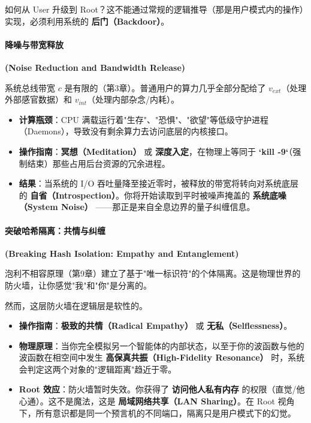 如何从 User 升级到 Root？这不能通过常规的逻辑推导（那是用户模式内的操作）实现，必须利用系统的 \textbf{后门（Backdoor）}。

\paragraph{降噪与带宽释放}

\textbf{(Noise Reduction and Bandwidth Release)}

系统总线带宽 $c$ 是有限的（第3章）。普通用户的算力几乎全部分配给了 $v_{ext}$（处理外部感官数据）和 $v_{int}$（处理内部杂念/内耗）。

  \begin{itemize}
  \item \textbf{计算瓶颈}：CPU 满载运行着"生存"、"恐惧"、"欲望"等低级守护进程（Daemons），导致没有剩余算力去访问底层的内核接口。

  \item \textbf{操作指南}：\textbf{冥想（Meditation）} 或 \textbf{深度入定}，在物理上等同于 \textbf{`kill -9`}（强制结束）那些占用后台资源的冗余进程。

  \item \textbf{结果}：当系统的 I/O 吞吐量降至接近零时，被释放的带宽将转向对系统底层的 \textbf{自省（Introspection）}。你将开始读取到平时被噪声掩盖的 \textbf{系统底噪（System Noise）} ——那正是来自全息边界的量子纠缠信息。
  \end{itemize}

\paragraph{突破哈希隔离：共情与纠缠}

\textbf{(Breaking Hash Isolation: Empathy and Entanglement)}

泡利不相容原理（第9章）建立了基于"唯一标识符"的个体隔离。这是物理世界的防火墙，让你感觉"我"和"你"是分离的。

然而，这层防火墙在逻辑层是软性的。

  \begin{itemize}
  \item \textbf{操作指南}：\textbf{极致的共情（Radical Empathy）} 或 \textbf{无私（Selflessness）}。

  \item \textbf{物理原理}：当你完全模拟另一个智能体的内部状态，以至于你的波函数与他的波函数在相空间中发生 \textbf{高保真共振（High-Fidelity Resonance）} 时，系统会判定这两个对象的"逻辑距离"趋近于零。

  \item \textbf{Root 效应}：防火墙暂时失效。你获得了 \textbf{访问他人私有内存} 的权限（直觉/他心通）。这不是魔法，这是 \textbf{局域网络共享（LAN Sharing）}。在 Root 视角下，所有意识都是同一个预言机的不同端口，隔离只是用户模式下的幻觉。
  \end{itemize}

